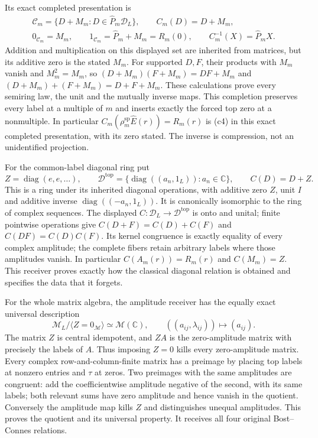 Its exact completed presentation is
\begin{equation}\tag{HCR15}
\begin{gathered}
 \mathscr C_m=\{D+M_m:D\in\widehat P_m\mathscr D_L\},\qquad
 C_m(D)=D+M_m,\\
 0_{\mathscr C_m}=M_m,\qquad
 1_{\mathscr C_m}=\widehat P_m+M_m=R_m(0),\qquad
 C_m^{-1}(X)=\widehat P_mX.
\end{gathered}
\end{equation}
Addition and multiplication on this displayed set are inherited
from matrices, but its additive zero is the stated $M_m$.
For supported $D,F$, their products with $M_m$ vanish and
$M_m^2=M_m$, so
$(D+M_m)(F+M_m)=DF+M_m$ and
$(D+M_m)+(F+M_m)=D+F+M_m$.
These calculations prove every semiring law, the unit and
the mutually inverse maps. This completion preserves every
label at a multiple of $m$ and inserts exactly the forced
top zero at a nonmultiple. In particular
$C_m(\rho_m^{\mathrm{sp}}\widehat E(r))=R_m(r)$ is (c4)
in this exact completed presentation, with its zero stated.
The inverse is compression, not an unidentified projection.

For the common-label diagonal ring put
\begin{equation}\tag{HCR16}
 Z=\operatorname{diag}(e,e,\ldots),\qquad
 \mathscr D^{\mathrm{top}}=
    \{\operatorname{diag}((a_n,1_L)):a_n\in\mathbb C\},\qquad
 C(D)=D+Z.
\end{equation}
This is a ring under its inherited diagonal operations,
with additive zero $Z$, unit $I$ and additive inverse
$\operatorname{diag}((-a_n,1_L))$. It is canonically
isomorphic to the ring of complex sequences. The displayed
$C:\mathscr D_L\to\mathscr D^{\mathrm{top}}$ is onto and
unital; finite pointwise operations give
$C(D+F)=C(D)+C(F)$ and $C(DF)=C(D)C(F)$.
Its kernel congruence is exactly equality of every complex
amplitude; the complete fibers retain arbitrary labels
where those amplitudes vanish. In particular
$C(A_m(r))=R_m(r)$ and $C(M_m)=Z$.
This receiver proves exactly how the classical diagonal
relation is obtained and specifies the data that it forgets.

For the whole matrix algebra, the amplitude receiver has
the equally exact universal description
\begin{equation}\tag{HCR17}
 \mathscr M_L/\langle Z=0_{\mathscr M}\rangle
       \simeq\mathscr M(\mathbb C),\qquad
 ((a_{ij},\lambda_{ij}))\longmapsto(a_{ij}).
\end{equation}
The matrix $Z$ is central idempotent, and $ZA$ is the
zero-amplitude matrix with precisely the labels of $A$.
Thus imposing $Z=0$ kills every zero-amplitude matrix.
Every complex row-and-column-finite matrix has a preimage
by placing top labels at nonzero entries and $\tau$ at
zeros. Two preimages with the same amplitudes are congruent:
add the coefficientwise amplitude negative of the second,
with its same labels; both relevant sums have zero amplitude
and hence vanish in the quotient. Conversely the amplitude
map kills $Z$ and distinguishes unequal amplitudes.
This proves the quotient and its universal property.
It receives all four original Bost--Connes relations.

